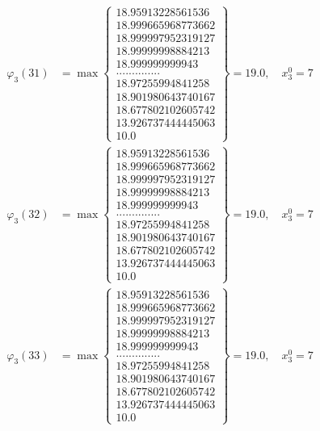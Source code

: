 \documentclass{article}
\begin{document}
\begin{align*}
  
  
  
\varphi_{3}(31) &= \max \left\{ \begin{array}{c}
18.95913228561536 \\
 18.999665968773662 \\
 18.999997952319127 \\
 18.99999998884213 \\
 18.999999999943 \\
 .............. \\
 18.97255994841258 \\
 18.901980643740167 \\
 18.677802102605742 \\
 13.926737444445063 \\
 10.0
\end{array} \right\} = 19.0, \quad x_{3}^0 = 7\\
  
  
  
  
\varphi_{3}(32) &= \max \left\{ \begin{array}{c}
18.95913228561536 \\
 18.999665968773662 \\
 18.999997952319127 \\
 18.99999998884213 \\
 18.999999999943 \\
 .............. \\
 18.97255994841258 \\
 18.901980643740167 \\
 18.677802102605742 \\
 13.926737444445063 \\
 10.0
\end{array} \right\} = 19.0, \quad x_{3}^0 = 7\\
  
  
  
  
\varphi_{3}(33) &= \max \left\{ \begin{array}{c}
18.95913228561536 \\
 18.999665968773662 \\
 18.999997952319127 \\
 18.99999998884213 \\
 18.999999999943 \\
 .............. \\
 18.97255994841258 \\
 18.901980643740167 \\
 18.677802102605742 \\
 13.926737444445063 \\
 10.0
\end{array} \right\} = 19.0, \quad x_{3}^0 = 7\\
  

\end{align*}
\end{document}
